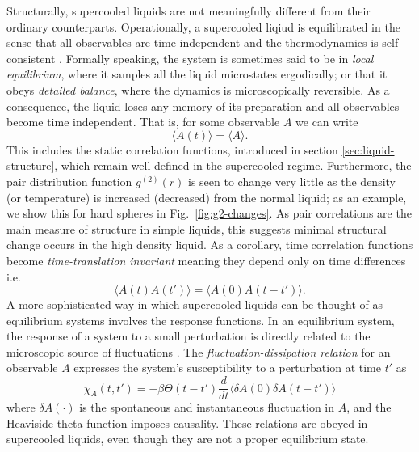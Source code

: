 \documentclass[11pt,twoside]{report}
\begin{document}
Structurally, supercooled liquids are not meaningfully different from their ordinary counterparts.
Operationally, a supercooled liqiud is equilibrated in the sense that all observables are time independent and the thermodynamics is self-consistent%
.
Formally speaking, the system is sometimes said to be in \emph{local equilibrium}, where it samples all the liquid microstates ergodically; or that it obeys \emph{detailed balance}, where the dynamics is microscopically reversible.
As a consequence, the liquid loses any memory of its preparation and all observables become time independent.
That is, for some observable $A$ we can write
\begin{equation*}
  \langle A(t) \rangle = \langle A \rangle.
\end{equation*}
This includes the static correlation functions, introduced in section \ref{sec:liquid-structure}, which remain well-defined in the supercooled regime.
Furthermore, the pair distribution function $g^{(2)}(r)$ is seen to change very little as the density (or temperature) is increased (decreased) from the normal liquid; as an example, we show this for hard spheres in Fig.\ \ref{fig:g2-changes}.
As pair correlations are the main measure of structure in simple liquids, this suggests minimal structural change occurs in the high density liquid.
As a corollary, time correlation functions become \emph{time-translation invariant} meaning they depend only on time differences i.e.\
\begin{equation*}
  \langle A(t) A(t') \rangle = \langle A(0) A(t - t') \rangle.
\end{equation*}
A more sophisticated way in which supercooled liquids can be thought of as equilibrium systems involves the response functions.
In an equilibrium system, the response of a system to a small perturbation is directly related to the microscopic source of fluctuations%
\marginfootnote{Temperature, in the case of liquids.}.
The \emph{fluctuation-dissipation relation} for an observable $A$ expresses the system's susceptibility to a perturbation at time $t'$ as \cite{Chandler1987}
\begin{equation*}
  \chi_A (t, t')
  =
  - \beta \Theta(t - t')
  \frac{d}{dt}
  \big\langle
  \delta A(0)
  \delta A(t - t')
  \big\rangle
\end{equation*}
where $\delta A(\cdot)$ is the spontaneous and instantaneous fluctuation in $A$, and the Heaviside theta function imposes causality.
These relations are obeyed in supercooled liquids, even though they are not a proper equilibrium state.
\end{document}
